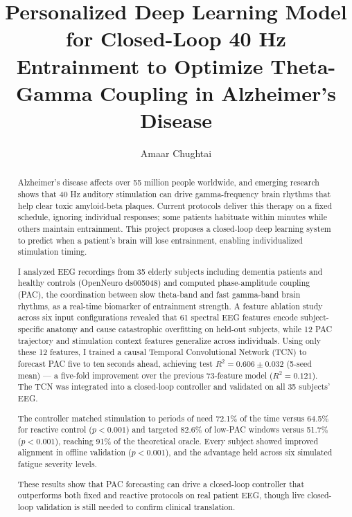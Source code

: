 \documentclass[11pt,letterpaper]{article}
\begin{document}
\title{Personalized Deep Learning Model for Closed-Loop 40 Hz Entrainment to Optimize Theta-Gamma Coupling in Alzheimer's Disease}

\author{Amaar Chughtai}
\date{}
\maketitle
\thispagestyle{plain}

\begin{abstract}
Alzheimer's disease affects over 55 million people worldwide, and emerging research shows that 40 Hz auditory stimulation can drive gamma-frequency brain rhythms that help clear toxic amyloid-beta plaques. Current protocols deliver this therapy on a fixed schedule, ignoring individual responses; some patients habituate within minutes while others maintain entrainment. This project proposes a closed-loop deep learning system to predict when a patient's brain will lose entrainment, enabling individualized stimulation timing.

I analyzed EEG recordings from 35 elderly subjects including dementia patients and healthy controls (OpenNeuro ds005048) and computed phase-amplitude coupling (PAC), the coordination between slow theta-band and fast gamma-band brain rhythms, as a real-time biomarker of entrainment strength. A feature ablation study across six input configurations revealed that 61 spectral EEG features encode subject-specific anatomy and cause catastrophic overfitting on held-out subjects, while 12 PAC trajectory and stimulation context features generalize across individuals. Using only these 12 features, I trained a causal Temporal Convolutional Network (TCN) to forecast PAC five to ten seconds ahead, achieving test $R^2 = 0.606 \pm 0.032$ (5-seed mean) --- a five-fold improvement over the previous 73-feature model ($R^2 = 0.121$). The TCN was integrated into a closed-loop controller and validated on all 35 subjects' EEG.

The controller matched stimulation to periods of need 72.1\% of the time versus 64.5\% for reactive control ($p < 0.001$) and targeted 82.6\% of low-PAC windows versus 51.7\% ($p < 0.001$), reaching 91\% of the theoretical oracle. Every subject showed improved alignment in offline validation ($p < 0.001$), and the advantage held across six simulated fatigue severity levels.

These results show that PAC forecasting can drive a closed-loop controller that outperforms both fixed and reactive protocols on real patient EEG, though live closed-loop validation is still needed to confirm clinical translation.
\end{abstract}
\end{document}
